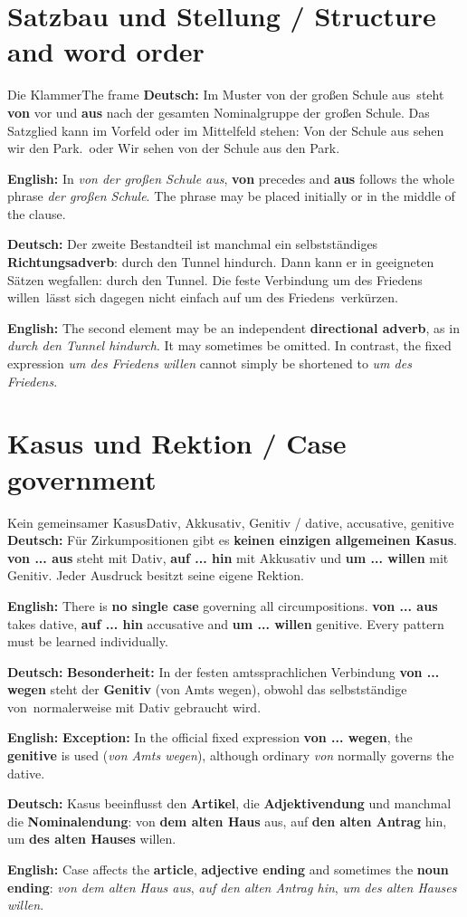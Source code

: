\documentclass[a4paper,11pt]{article}
\newcommand{\GermanText}[1]{\textbf{Deutsch: }#1\par}
\newcommand{\EnglishText}[1]{{\small\color{SoftGray}\textbf{English: }#1\par}}
\begin{document}
\section{Satzbau und Stellung / Structure and word order}
\begin{grammarentry}{Die Klammer}{The frame}
\GermanText{Im Muster \glqq von der großen Schule aus\grqq\ steht \textbf{von} vor und \textbf{aus} nach der gesamten Nominalgruppe \glqq der großen Schule\grqq. Das Satzglied kann im Vorfeld oder im Mittelfeld stehen: \glqq Von der Schule aus sehen wir den Park.\grqq\ oder \glqq Wir sehen von der Schule aus den Park.\grqq}
\EnglishText{In \emph{von der großen Schule aus}, \textbf{von} precedes and \textbf{aus} follows the whole phrase \emph{der großen Schule}. The phrase may be placed initially or in the middle of the clause.}
\GermanText{Der zweite Bestandteil ist manchmal ein selbstständiges \textbf{Richtungsadverb}: \glqq durch den Tunnel hindurch\grqq. Dann kann er in geeigneten Sätzen wegfallen: \glqq durch den Tunnel\grqq. Die feste Verbindung \glqq um des Friedens willen\grqq\ lässt sich dagegen nicht einfach auf \glqq um des Friedens\grqq\ verkürzen.}
\EnglishText{The second element may be an independent \textbf{directional adverb}, as in \emph{durch den Tunnel hindurch}. It may sometimes be omitted. In contrast, the fixed expression \emph{um des Friedens willen} cannot simply be shortened to \emph{um des Friedens}.}
\end{grammarentry}

\section{Kasus und Rektion / Case government}
\begin{grammarentry}{Kein gemeinsamer Kasus}{Dativ, Akkusativ, Genitiv / dative, accusative, genitive}
\GermanText{Für Zirkumpositionen gibt es \textbf{keinen einzigen allgemeinen Kasus}. \textbf{von ... aus} steht mit Dativ, \textbf{auf ... hin} mit Akkusativ und \textbf{um ... willen} mit Genitiv. Jeder Ausdruck besitzt seine eigene Rektion.}
\EnglishText{There is \textbf{no single case} governing all circumpositions. \textbf{von ... aus} takes dative, \textbf{auf ... hin} accusative and \textbf{um ... willen} genitive. Every pattern must be learned individually.}
\GermanText{\textbf{Besonderheit:} In der festen amtssprachlichen Verbindung \textbf{von ... wegen} steht der \textbf{Genitiv} (\glqq von Amts wegen\grqq), obwohl das selbstständige \glqq von\grqq\ normalerweise mit Dativ gebraucht wird.}
\EnglishText{\textbf{Exception:} In the official fixed expression \textbf{von ... wegen}, the \textbf{genitive} is used (\emph{von Amts wegen}), although ordinary \emph{von} normally governs the dative.}
\GermanText{Kasus beeinflusst den \textbf{Artikel}, die \textbf{Adjektivendung} und manchmal die \textbf{Nominalendung}: \glqq von \textbf{dem alten Haus} aus\grqq, \glqq auf \textbf{den alten Antrag} hin\grqq, \glqq um \textbf{des alten Hauses} willen\grqq.}
\EnglishText{Case affects the \textbf{article}, \textbf{adjective ending} and sometimes the \textbf{noun ending}: \emph{von dem alten Haus aus}, \emph{auf den alten Antrag hin}, \emph{um des alten Hauses willen}.}
\end{grammarentry}
\end{document}
